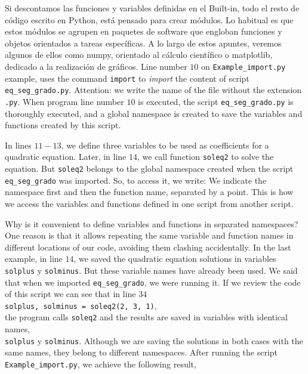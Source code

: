 \begin{paracol}{2}
Si descontamos las funciones y variables definidas en el Built-in, todo el resto de código escrito en Python, está pensado para crear módulos. Lo habitual es que estos módulos se agrupen en paquetes de software que engloban funciones y objetos orientados a tareas específicas. A lo largo de estos apuntes, veremos algunos de ellos como numpy, orientado al cálculo científico o matplotlib, dedicado a la realización de gráficos.
\switchcolumn
Line number $10$ on \texttt{Example_import.py} example, uses the command \texttt{import} to \emph{import} the content of script \texttt{eq_seg_grado.py}. Attention: we write the name of the file without the extension \texttt{.py}. When program line number $10$ is executed, the script \texttt{eq_seg_grado.py} is thoroughly executed, and a global namespace is created to save the variables and functions created by this script.

In lines $11 - 13$, we define three variables to be used as coefficients for a quadratic equation. Later, in line $14$, we call function \texttt{soleq2} to solve the equation. But \texttt{soleq2} belongs to the global namespace created when the script \texttt{eq_seg_grado} was imported. So, to access it, we write:
We indicate the namespace first and then the function name, separated by a point. This is how we access the variables and functions defined in one script from another script. 

Why is it convenient to define variables and functions in separated namespaces? One reason is that it allows repeating the same variable and function names in different locations of our code, avoiding them clashing accidentally. In the last example, in line $14$, we saved the quadratic equation solutions in variables \texttt{solplus} y \texttt{solminus}. But these variable names have already been used. We said that when we imported \texttt{eq_seg_grado}, we were running it. If we review the code of this script we can see that in line $34$\\ \texttt{solplus, solminus = soleq2(2, 3, 1)},\\ the program calls \texttt{soleq2} and the results are saved in variables with identical names,\\ \texttt{solplus} y \texttt{solminus}. Although we are saving the solutions in both cases with the same names, they belong to different namespaces. After running the script \texttt{Example_import.py}, we achieve the following result,   


\end{paracol}
